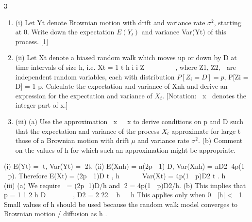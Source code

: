 \documentclass[a4paper,12pt]{article}
\begin{document}
3 

\begin{enumerate}
    \item (i) Let Yt denote Brownian motion with drift \mu and variance rate $\sigma^2$, starting at 0.
Write down the expectation $E(Y_t)$ and variance Var(Yt) of this process. [1]
\item (ii) Let Xt denote a biased random walk which moves up or down by D at time
intervals of size h, i.e.
Xt = 1
t
h
i i Z
 
 
  ,
where Z1, Z2,  are independent random variables, each with distribution $P[Z_i = D] = p$, P[Zi = 	D] = 1 	 p. Calculate the expectation and variance of Xnh and derive an expression for the expectation and variance of $X_t$. 
[Notation: x denotes the integer part of x.]
\item (iii) (a) Use the approximation x  x to derive conditions on p and D such
that the expectation and variance of the process $X_t$ approximate for
large t those of a Brownian motion with drift $\mu$ and variance rate $\sigma^2$.
(b) Comment on the values of h for which such an approximation might be
appropriate.
\end{enumerate}
 (i) E(Yt) = t, Var(Yt) = 2t.
(ii) E(Xnh) = n(2p  1) D, Var(Xnh) = nD2  4p(1  p).
Therefore E(Xt) = (2p  1)D t ,
h
 
 
Var(Xt) = 4p(1  p)D2 t .
h
 
 
(iii) (a) We require  = (2p 1)D/h and 2 = 4p(1  p)D2/h.
(b) This implies that p = 1 1
2
h
D
     
\mu \sigma
, D2 = 2 22.  h   h
This applies only when 0  |h| < 1. Small values of h should be used
because the random walk model converges to Brownian motion /
diffusion as h .

\end{document}
